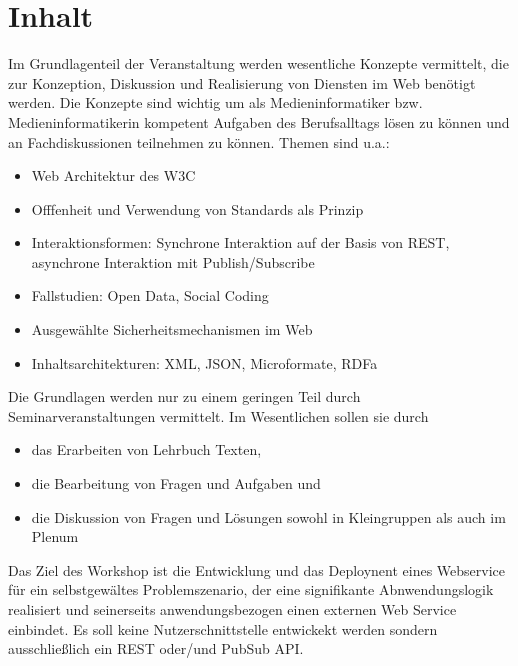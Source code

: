 \hypertarget{inhaltpathlabelmi-2017modulbeschreibungen-bachelorba_grundlagen-des-web}{%
\section*{Inhalt\label{/mi-2017/modulbeschreibungen-bachelor/BA_Grundlagen-des-web}}\label{inhaltpathlabelmi-2017modulbeschreibungen-bachelorba_grundlagen-des-web}}

Im Grundlagenteil der Veranstaltung werden wesentliche Konzepte
vermittelt, die zur Konzeption, Diskussion und Realisierung von Diensten
im Web benötigt werden. Die Konzepte sind wichtig um als
Medieninformatiker bzw. Medieninformatikerin kompetent Aufgaben des
Berufsalltags lösen zu können und an Fachdiskussionen teilnehmen zu
können. Themen sind u.a.:

\begin{itemize}
\tightlist
\item
  Web Architektur des W3C
\item
  Offfenheit und Verwendung von Standards als Prinzip
\item
  Interaktionsformen: Synchrone Interaktion auf der Basis von REST,
  asynchrone Interaktion mit Publish/Subscribe
\item
  Fallstudien: Open Data, Social Coding
\item
  Ausgewählte Sicherheitsmechanismen im Web
\item
  Inhaltsarchitekturen: XML, JSON, Microformate, RDFa
\end{itemize}

Die Grundlagen werden nur zu einem geringen Teil durch
Seminarveranstaltungen vermittelt. Im Wesentlichen sollen sie durch

\begin{itemize}
\tightlist
\item
  das Erarbeiten von Lehrbuch Texten,
\item
  die Bearbeitung von Fragen und Aufgaben und
\item
  die Diskussion von Fragen und Lösungen sowohl in Kleingruppen als auch
  im Plenum
\end{itemize}

Das Ziel des Workshop ist die Entwicklung und das Deploynent eines
Webservice für ein selbstgewältes Problemszenario, der eine signifikante
Abnwendungslogik realisiert und seinerseits anwendungsbezogen einen
externen Web Service einbindet. Es soll keine Nutzerschnittstelle
entwickekt werden sondern ausschließlich ein REST oder/und PubSub API.

